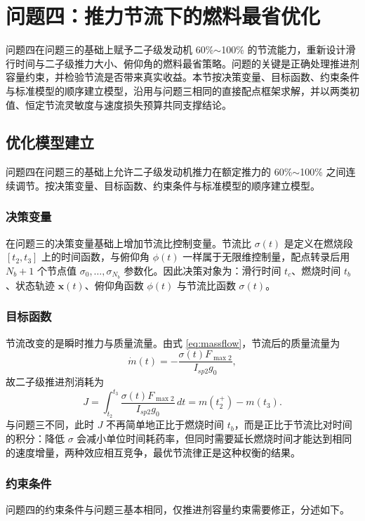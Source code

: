 \documentclass[withoutpreface,bwprint]{cumcmthesis}
\begin{document}
\section{问题四：推力节流下的燃料最省优化}

问题四在问题三的基础上赋予二子级发动机 60\%$\sim$100\% 的节流能力，重新设计滑行时间与二子级推力大小、俯仰角的燃料最省策略。问题的关键是正确处理推进剂容量约束，并检验节流是否带来真实收益。本节按决策变量、目标函数、约束条件与标准模型的顺序建立模型，沿用与问题三相同的直接配点框架求解，并以两类初值、恒定节流灵敏度与速度损失预算共同支撑结论。

\subsection{优化模型建立}
问题四在问题三的基础上允许二子级发动机推力在额定推力的 60\%$\sim$100\% 之间连续调节。按决策变量、目标函数、约束条件与标准模型的顺序建立模型。

\subsubsection{决策变量}
在问题三的决策变量基础上增加节流比控制变量。节流比 $\sigma(t)$ 是定义在燃烧段 $[t_2,t_3]$ 上的时间函数，与俯仰角 $\phi(t)$ 一样属于无限维控制量，配点转录后用 $N_b+1$ 个节点值 $\sigma_0,\dots,\sigma_{N_b}$ 参数化。因此决策对象为：滑行时间 $t_c$、燃烧时间 $t_b$、状态轨迹 $\bm x(t)$、俯仰角函数 $\phi(t)$ 与节流比函数 $\sigma(t)$。

\subsubsection{目标函数}
节流改变的是瞬时推力与质量流量。由式 \eqref{eq:massflow}，节流后的质量流量为
\begin{equation}
\dot m(t)=-\frac{\sigma(t)F_{\max2}}{I_{sp2}g_0},
\label{eq:q4-massflow}
\end{equation}
故二子级推进剂消耗为
\begin{equation}
J=\int_{t_2}^{t_3}\frac{\sigma(t)F_{\max2}}{I_{sp2}g_0}\,dt
=m(t_2^{+})-m(t_3).
\label{eq:obj4}
\end{equation}
与问题三不同，此时 $J$ 不再简单地正比于燃烧时间 $t_b$，而是正比于节流比对时间的积分：降低 $\sigma$ 会减小单位时间耗药率，但同时需要延长燃烧时间才能达到相同的速度增量，两种效应相互竞争，最优节流律正是这种权衡的结果。

\subsubsection{约束条件}
问题四的约束条件与问题三基本相同，仅推进剂容量约束需要修正，分述如下。
\end{document}
